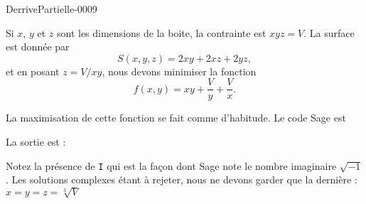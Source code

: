 
\begin{corrige}{DerrivePartielle-0009}

	Si $x$, $y$ et $z$ sont les dimensions de la boite, la contrainte est $xyz=V$. La surface est donnée par
	\begin{equation}
		S(x,y,z)=2xy+2xz+2yz,
	\end{equation}
	et en posant $z=V/xy$, nous devons minimiser la fonction
	\begin{equation}
		f(x,y)=xy+\frac{ V }{ y }+\frac{ V }{ x }.
	\end{equation}
	
	La maximisation de cette fonction se fait comme d'habitude. Le code Sage est 


	La sortie est :


	Notez la présence de \verb+I+ qui est la façon dont Sage note le nombre imaginaire $\sqrt{-1}$. Les solutions complexes étant à rejeter, nous ne devons garder que la dernière :  $x=y=z=\sqrt[3]{V}$

\end{corrige}
